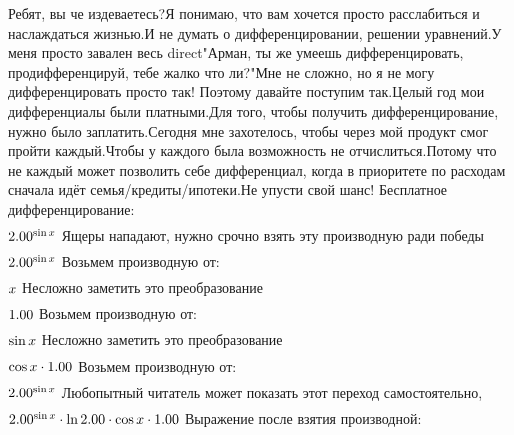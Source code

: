 Ребят, вы че издеваетесь?Я понимаю, что вам хочется просто расслабиться и наслаждаться жизнью.И не думать о дифференцировании, решении уравнений.У меня просто завален весь direct"Арман, ты же умеешь дифференцировать, продифференцируй, тебе жалко что ли?"Мне не сложно, но я не могу дифференцировать просто так! Поэтому давайте поступим так.Целый год мои дифференциалы были платными.Для того, чтобы получить дифференцирование, нужно было заплатить.Сегодня мне захотелось, чтобы через мой продукт смог пройти каждый.Чтобы у каждого была возможность не отчислиться.Потому что не каждый может позволить себе дифференциал, когда в приоритете по расходам сначала идёт семья/кредиты/ипотеки.Не упусти свой шанс! Бесплатное дифференцирование: 
\begin{gather}
\end{gather}
\begin{math}
2.00 ^ {\sin x }\\
\end{math}
Ящеры нападают, нужно срочно взять эту производную ради победы
\begin{gather}
\end{gather}
\begin{math}
2.00 ^ {\sin x }\\
\end{math}
Возьмем производную от: 
\begin{gather}
\end{gather}
\begin{math}
x \\
\end{math}
Несложно заметить это преобразование
\begin{gather}
\end{gather}
\begin{math}
1.00 \\
\end{math}
Возьмем производную от: 
\begin{gather}
\end{gather}
\begin{math}
\sin x \\
\end{math}
Несложно заметить это преобразование
\begin{gather}
\end{gather}
\begin{math}
\cos x \cdot 1.00 \\
\end{math}
Возьмем производную от: 
\begin{gather}
\end{gather}
\begin{math}
2.00 ^ {\sin x }\\
\end{math}
Любопытный читатель может показать этот переход самостоятельно, 
\begin{gather}
\end{gather}
\begin{math}
2.00 ^ {\sin x }\cdot \ln 2.00 \cdot \cos x \cdot 1.00 \\
\end{math}
Выражение после взятия производной:

